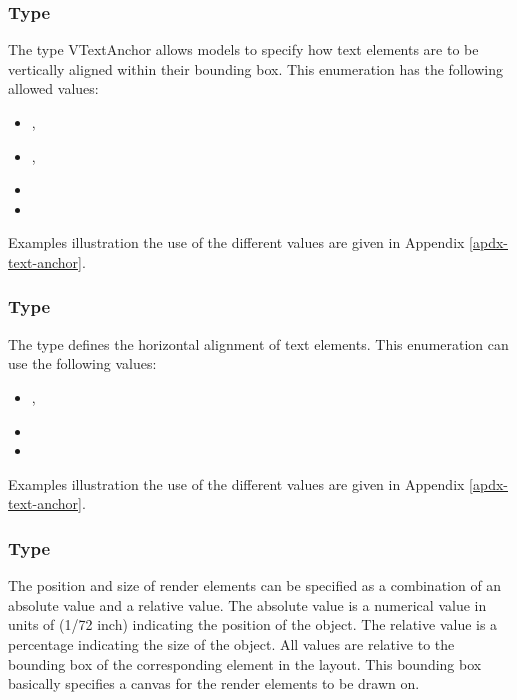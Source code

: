 \subsubsection{Type \fixttspace{}}

The type VTextAnchor allows models to specify how text elements are to be
vertically aligned within their bounding box. This enumeration has the following allowed values: 

\begin{itemize}
 \item {},
 \item {},
 \item {} 
 \item {}
\end{itemize}

Examples illustration the use of the different \VTextAnchor values are given in Appendix \ref{apdx-text-anchor}.




\subsubsection{Type \fixttspace{}}

The type \HTextAnchor defines the horizontal alignment of text elements. This enumeration can use the following values: 

\begin{itemize}
 \item {},
 \item {}
 \item {}
\end{itemize}

Examples illustration the use of the different \HTextAnchor values are given in Appendix \ref{apdx-text-anchor}.



\subsubsection{Type \fixttspace{}}

The position and size of render elements can be specified as a combination of an absolute value and a relative value. The absolute value is a numerical value in units of  (1/72 inch) indicating the position of the object. The relative value is a percentage indicating the size of the object. All values are relative to the bounding box of the corresponding element in the layout. This bounding box basically specifies a canvas for the render elements to be drawn on.

